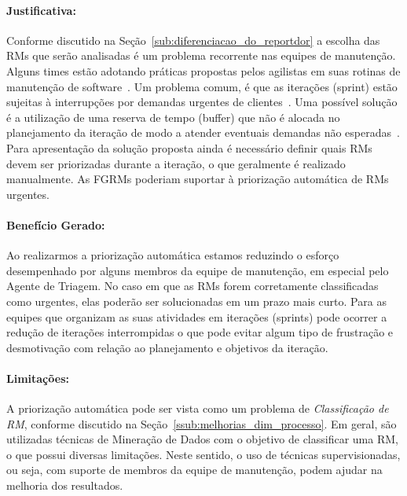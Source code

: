 \paragraph{Justificativa:}
\label{par:justificativa_s07}

Conforme discutido na Seção~\ref{sub:diferenciacao_do_reportdor} a escolha das
RMs que serão analisadas é um problema recorrente nas equipes de manutenção.
Alguns times estão adotando práticas propostas pelos agilistas em suas rotinas
de manutenção de software~\cite{svensson2005introducing}. Um problema comum, é
que as iterações (sprint) estão sujeitas à interrupções por demandas urgentes de
clientes~\cite{bennett2000software}. Uma possível solução é a utilização de uma
reserva de tempo (buffer) que não é alocada no planejamento da iteração de modo
a atender eventuais demandas não esperadas~\cite{schwaber2002agile}. Para
apresentação da solução proposta ainda é necessário definir quais RMs devem ser
priorizadas durante a iteração, o que geralmente é realizado manualmente. As
FGRMs poderiam suportar à priorização automática de RMs urgentes.

\paragraph{Benefício Gerado:}
\label{par:papéis_afetados_s07}

Ao realizarmos a priorização automática estamos reduzindo o esforço desempenhado
por alguns membros da equipe de manutenção, em especial pelo Agente de Triagem.
No caso em que as RMs forem corretamente classificadas como urgentes, elas
poderão ser solucionadas em um prazo mais curto. Para as equipes que organizam
as suas atividades em iterações (sprints) pode ocorrer a redução de iterações
interrompidas o que pode evitar algum tipo de frustração e desmotivação com
relação ao planejamento e objetivos da iteração.

\paragraph{Limitações:}
\label{par:limitacoes_s07}

A priorização automática pode ser vista como um problema de
\textit{Classificação de RM}, conforme discutido na
Seção~\ref{ssub:melhorias_dim_processo}. Em geral, são utilizadas técnicas de
Mineração de Dados com o objetivo de classificar uma RM, o que possui diversas
limitações. Neste sentido, o uso de técnicas supervisionadas, ou seja, com
suporte de membros da equipe de manutenção, podem ajudar na melhoria dos
resultados.

